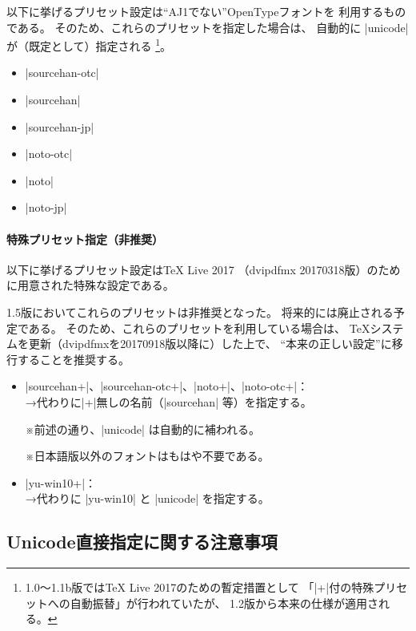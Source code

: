 \documentclass[uplatex,dvipdfmx,a4paper]{jsarticle}
\newcommand{\Note}{\par\noindent ※}
\providecommand{\Strong}[1]{\textsf{#1}}
\begin{document}
以下に挙げるプリセット設定は“AJ1でない”OpenTypeフォントを
利用するものである。
そのため、これらのプリセットを指定した場合は、
自動的に |unicode| が（既定として）指定される%
\footnote{1.0～1.1b版では{\TeX} Live 2017のための暫定措置として
「|+|付の特殊プリセットへの自動振替」が行われていたが、
1.2版から本来の仕様が適用される。}。

\begin{itemize}
\item |sourcehan-otc|
\item |sourcehan|
\item |sourcehan-jp|
\item |noto-otc|
\item |noto|
\item |noto-jp|
\end{itemize}

\paragraph{特殊プリセット指定\<（非推奨）}

以下に挙げるプリセット設定は{\TeX} Live 2017%
（dvipdfmx 20170318版）のために用意された特殊な設定である。

1.5版においてこれらのプリセットは\Strong{非推奨}となった。
将来的には廃止される予定である。
そのため、これらのプリセットを利用している場合は、
\Strong{{\TeX}システムを更新}（dvipdfmxを20170918版以降に）した上で、
“本来の正しい設定”に移行することを推奨する。

\begin{itemize}
\item |sourcehan+|、|sourcehan-otc+|、|noto+|、|noto-otc+|：\\
  →代わりに|+|無しの名前（|sourcehan| 等）を指定する。
  \Note 前述の通り、|unicode| は自動的に補われる。
  \Note 日本語版以外のフォントはもはや不要である。

\item |yu-win10+|：\\
  →代わりに |yu-win10| と |unicode| を指定する。
\end{itemize}

\subsection{Unicode直接指定に関する注意事項}
\label{ssec:DirectUnicodeNotice}
\end{document}
